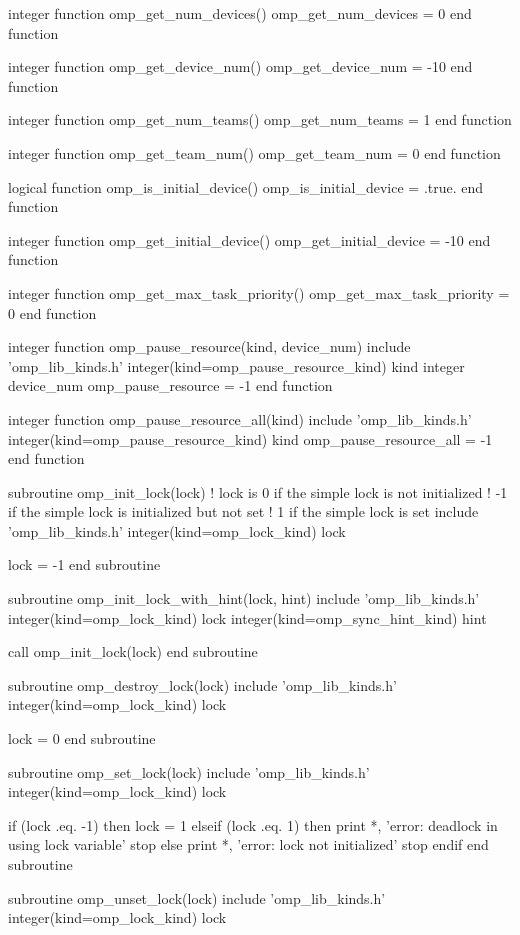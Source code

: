{\begin{ompfFunction}
integer function omp_get_num_devices()
  omp_get_num_devices = 0
end function

integer function omp_get_device_num()
  omp_get_device_num = -10
end function

integer function omp_get_num_teams()
  omp_get_num_teams = 1
end function

integer function omp_get_team_num()
  omp_get_team_num = 0
end function

logical function omp_is_initial_device()
  omp_is_initial_device = .true.
end function

integer function omp_get_initial_device()
  omp_get_initial_device = -10
end function

integer function omp_get_max_task_priority()
  omp_get_max_task_priority = 0
end function

integer function omp_pause_resource(kind, device_num)
  include 'omp_lib_kinds.h'
  integer(kind=omp_pause_resource_kind) kind
  integer device_num
  omp_pause_resource = -1
end function

integer function omp_pause_resource_all(kind)
  include 'omp_lib_kinds.h'
  integer(kind=omp_pause_resource_kind) kind
  omp_pause_resource_all = -1
end function

subroutine omp_init_lock(lock)
  ! lock is 0 if the simple lock is not initialized
  !        -1 if the simple lock is initialized but not set
  !         1 if the simple lock is set
  include 'omp_lib_kinds.h'
  integer(kind=omp_lock_kind) lock

  lock = -1
end subroutine

subroutine omp_init_lock_with_hint(lock, hint)
  include 'omp_lib_kinds.h'
  integer(kind=omp_lock_kind) lock
  integer(kind=omp_sync_hint_kind) hint

  call omp_init_lock(lock)
end subroutine

subroutine omp_destroy_lock(lock)
  include 'omp_lib_kinds.h'
  integer(kind=omp_lock_kind) lock

  lock = 0
end subroutine

subroutine omp_set_lock(lock)
  include 'omp_lib_kinds.h'
  integer(kind=omp_lock_kind) lock

  if (lock .eq. -1) then
    lock = 1
  elseif (lock .eq. 1) then
    print *, 'error: deadlock in using lock variable'
    stop
  else
    print *, 'error: lock not initialized'
    stop
  endif
end subroutine

subroutine omp_unset_lock(lock)
  include 'omp_lib_kinds.h'
  integer(kind=omp_lock_kind) lock


\end{ompfFunction}}
